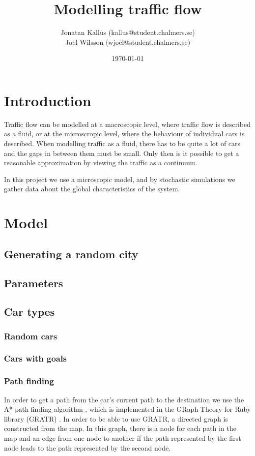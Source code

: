 \documentclass[11pt,a4paper]{article}
\author{Jonatan Kallus (kallus@student.chalmers.se)\\
Joel Wilsson (wjoel@student.chalmers.se)}
\date{\today}
\title{Modelling traffic flow}
\begin{document}
\maketitle

\section{Introduction}
Traffic flow can be modelled at a macroscopic level, where traffic flow is
described as a fluid, or at the microscropic level, where the behaviour of
individual cars is described. When modelling traffic as a fluid, there has
to be quite a lot of cars and the gaps in between them must be small. Only
then is it possible to get a reasonable approximation by viewing the traffic
as a continuum. \cite{aziz}

In this project we use a microscopic model, and by stochastic simulations
we gather data about the global characteristics of the system. 

\section{Model}
\subsection{Generating a random city}
\subsection{Parameters}

\subsection{Car types}
\subsubsection{Random cars}
\subsubsection{Cars with goals}
\subsubsection{Path finding}
In order to get a path from the car's current path to the destination we use the
A* path finding algorithm \cite{astar}, which is implemented in the GRaph Theory
for Ruby library (GRATR) \cite{gratr}. In order to be able to use GRATR, a
directed graph is constructed from the map. In this graph, there is a node for
each path in the map and an edge from one node to another if the path
represented by the first node leads to the path represented by the second node.
\end{document}
